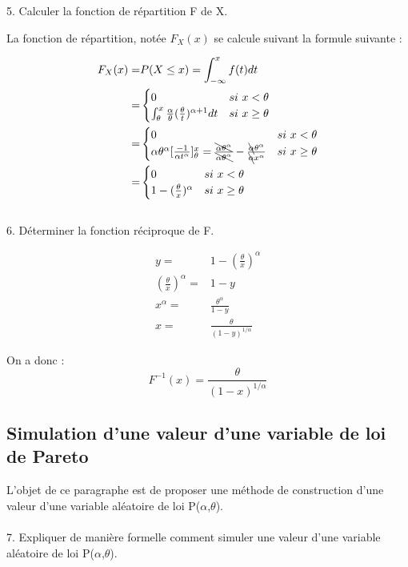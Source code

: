 \documentclass{article}
\begin{document}
5. Calculer la fonction de répartition F de X.

La fonction de répartition, notée $F_{X}(x)$ se calcule suivant la
formule suivante :

\begin{align*}
F_{X}(x)= & P(X\leq x)=\int_{-\infty}^{x}f(t)dt\\
= & \begin{cases}
0 & si\ x<\theta\\
\int_{\theta}^{x}\frac{\alpha}{\theta}(\frac{\theta}{t})^{\alpha+1}dt & si\ x\geq\theta
\end{cases}\\
= & \begin{cases}
0 & si\ x<\theta\\
\alpha\theta^{\alpha}[\frac{-1}{\alpha t^{\alpha}}]_{\theta}^{x}=\frac{\bcancel{\alpha\theta^{\alpha}}}{\bcancel{\alpha\theta^{\alpha}}}-\frac{\bcancel{\alpha}\theta^{\alpha}}{\bcancel{\alpha}x^{\alpha}} & si\ x\geq\theta
\end{cases}\\
= & \begin{cases}
0 & si\ x<\theta\\
1-(\frac{\theta}{x})^{\alpha} & si\ x\geq\theta
\end{cases}
\end{align*}
\\
6. Déterminer la fonction réciproque de F.

\begin{align*}
y= & 1-(\frac{\theta}{x})^{\alpha}\\
(\frac{\theta}{x})^{\alpha}= & 1-y\\
x^{\alpha}= & \frac{\theta^{\alpha}}{1-y}\\
x= & \frac{\theta}{(1-y)^{1/\alpha}}
\end{align*}

On a donc : 
\[
F^{-1}(x)=\frac{\theta}{(1-x)^{1/\alpha}}
\]


\subsection{Simulation d'une valeur d'une variable de loi de Pareto}

L\textquoteright objet de ce paragraphe est de proposer une méthode
de construction d\textquoteright une valeur d\textquoteright une variable
aléatoire de loi P($\alpha$,$\theta$).\\
\\
7. Expliquer de manière formelle comment simuler une valeur d\textquoteright une
variable aléatoire de loi P($\alpha$,$\theta$).
\end{document}
